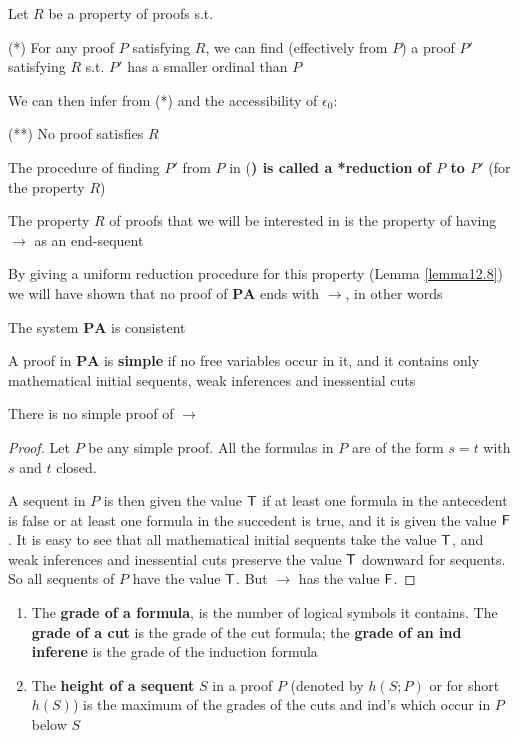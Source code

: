 \documentclass[11pt]{article}
\def \PA {\textbf{PA}}
\begin{document}
Let \(R\) be a property of proofs s.t.

(*) For any proof \(P\) satisfying \(R\), we can find (effectively from \(P\)) a proof \(P'\)
satisfying \(R\) s.t. \(P'\) has a smaller ordinal than \(P\)

We can then infer from (*) and the accessibility of \(\epsilon_0\):

(**) No proof satisfies \(R\)

The procedure of finding \(P'\) from \(P\) in (\textbf{) is called a *reduction of \(P\) to \(P'\)} (for
the property \(R\))

The property \(R\) of proofs that we will be interested in is the property of having \(\to\) as
an end-sequent

By giving a uniform reduction procedure for this property (Lemma \ref{lemma12.8}) we will have
shown that no proof of \(\PA\) ends with \(\to\), in other words

\begin{theorem}[]
\label{thm12.1}
The system \(\PA\) is consistent
\end{theorem}

\begin{definition}[]
A proof in \(\PA\) is \textbf{simple} if no free variables occur in it, and it contains only mathematical
initial sequents, weak inferences and inessential cuts
\end{definition}

\begin{lemma}[]
\label{lemma12.3}
There is no simple proof of \(\to\)
\end{lemma}

\begin{proof}
Let \(P\)  be any simple proof. All the formulas in \(P\) are of the form \(s=t\) with \(s\)
and \(t\) closed.

A sequent in \(P\) is then given the value \(\textsf{T}\) if at least one formula in the antecedent is
false or at least one formula in the succedent is true, and it is given the value \(\textsf{F}\). It is
easy to see  that all mathematical initial sequents take the value \(\textsf{T}\), and weak inferences
and inessential cuts preserve the value \(\textsf{T}\) downward for sequents. So all sequents of \(P\)
have the value \(\textsf{T}\). But \(\to\) has the value \(\textsf{F}\).
\end{proof}

\begin{definition}[]
\begin{enumerate}
\item The \textbf{grade of a formula}, is the number of logical symbols it contains. The \textbf{grade of a cut} is
the grade of the cut formula; the \textbf{grade of an ind inferene} is the grade of the induction formula
\item The \textbf{height of a sequent} \(S\) in a proof \(P\) (denoted by \(h(S;P)\) or for short \(h(S)\))
is the maximum of the grades of the cuts and ind's which occur in \(P\) below \(S\)
\end{enumerate}
\end{definition}
\end{document}

